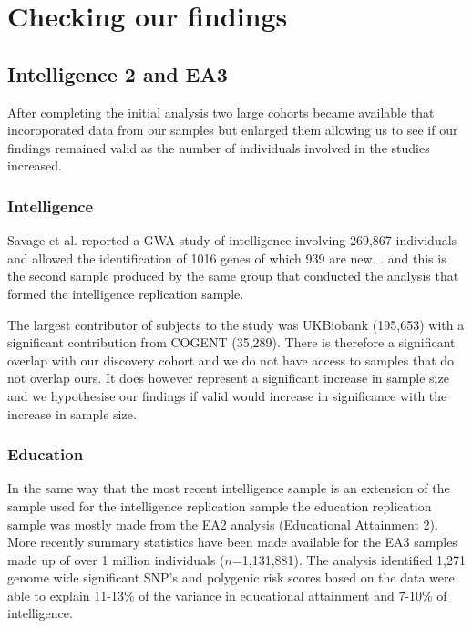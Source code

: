 \chapter{Checking our findings}
\label{chap:checking our findings}
\section{Intelligence 2 and EA3}


After completing the initial analysis two large cohorts became available that incoroporated data from our samples but enlarged them allowing us to see if our findings remained valid as the number of individuals involved in the studies increased. 

\subsection{Intelligence}

Savage et al. \cite{savage2018genome} reported a GWA study of intelligence involving 269,867 individuals and allowed the identification of 1016 genes of which 939 are new. 
. and this is the second sample produced by the same group that conducted the analysis that formed the intelligence replication sample. 

The largest contributor of subjects to the study was UKBiobank (195,653) with a significant contribution from COGENT (35,289). There is therefore a significant overlap with our discovery cohort and we do not have access to samples that do not overlap ours. It does however represent a significant increase in sample size and we hypothesise our findings if valid would increase in significance with the increase in sample size.


\subsection{Education}
In the same way that the most recent intelligence sample is an extension of the sample used for the intelligence replication sample the education replication sample was mostly made from the EA2 analysis (Educational Attainment 2)\cite{okbay2016genome}. More recently summary statistics have been made available for the EA3 samples made up of over 1 million individuals ($n$=1,131,881)\cite{lee2018gene}. The analysis identified  1,271 genome wide significant SNP's and polygenic risk scores based on the data were able to explain 11-13\% of the variance in educational attainment and 7-10\% of intelligence. 


